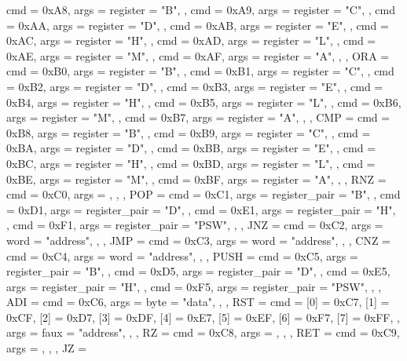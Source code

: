 {{        { cmd = 0xA8, args = {{register = "B"}}, },
        { cmd = 0xA9, args = {{register = "C"}}, },
        { cmd = 0xAA, args = {{register = "D"}}, },
        { cmd = 0xAB, args = {{register = "E"}}, },
        { cmd = 0xAC, args = {{register = "H"}}, },
        { cmd = 0xAD, args = {{register = "L"}}, },
        { cmd = 0xAE, args = {{register = "M"}}, },
        { cmd = 0xAF, args = {{register = "A"}}, },
    },
    ORA  = {
        { cmd = 0xB0, args = {{register = "B"}}, },
        { cmd = 0xB1, args = {{register = "C"}}, },
        { cmd = 0xB2, args = {{register = "D"}}, },
        { cmd = 0xB3, args = {{register = "E"}}, },
        { cmd = 0xB4, args = {{register = "H"}}, },
        { cmd = 0xB5, args = {{register = "L"}}, },
        { cmd = 0xB6, args = {{register = "M"}}, },
        { cmd = 0xB7, args = {{register = "A"}}, },
    },
    CMP  = {
        { cmd = 0xB8, args = {{register = "B"}}, },
        { cmd = 0xB9, args = {{register = "C"}}, },
        { cmd = 0xBA, args = {{register = "D"}}, },
        { cmd = 0xBB, args = {{register = "E"}}, },
        { cmd = 0xBC, args = {{register = "H"}}, },
        { cmd = 0xBD, args = {{register = "L"}}, },
        { cmd = 0xBE, args = {{register = "M"}}, },
        { cmd = 0xBF, args = {{register = "A"}}, },
    },
    RNZ  = {
        { cmd = 0xC0, args = {}, },
    },
    POP  = {
        { cmd = 0xC1, args = {{register_pair = "B"}}, },
        { cmd = 0xD1, args = {{register_pair = "D"}}, },
        { cmd = 0xE1, args = {{register_pair = "H"}}, },
        { cmd = 0xF1, args = {{register_pair = "PSW"}}, },
    },
    JNZ  = {
        { cmd = 0xC2, args = {{word = "address"}}, },
    },
    JMP  = {
        { cmd = 0xC3, args = {{word = "address"}}, },
    },
    CNZ  = {
        { cmd = 0xC4, args = {{word = "address"}}, },
    },
    PUSH = {
        { cmd = 0xC5, args = {{register_pair = "B"}}, },
        { cmd = 0xD5, args = {{register_pair = "D"}}, },
        { cmd = 0xE5, args = {{register_pair = "H"}}, },
        { cmd = 0xF5, args = {{register_pair = "PSW"}}, },
    },
    ADI  = {
        { cmd = 0xC6, args = {{byte = "data"}}, },
    },
    RST  = {
        {
            cmd = {
                [0] = 0xC7,
                [1] = 0xCF,
                [2] = 0xD7,
                [3] = 0xDF,
                [4] = 0xE7,
                [5] = 0xEF,
                [6] = 0xF7,
                [7] = 0xFF,
            },
            args = {{faux = "address"}},
        },
    },
    RZ   = {
        { cmd = 0xC8, args = {}, },
    },
    RET  = {
        { cmd = 0xC9, args = {}, },
    },
    JZ   = {
}}
